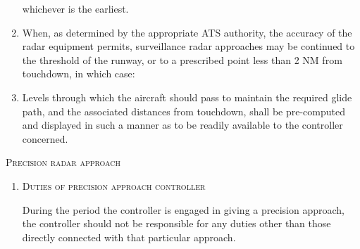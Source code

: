 \begin{enumeratesc}
\begin{enumerate}
\begin{enumalph}

            \noindent whichever is the earliest.
        \end{enumalph}

        \item When, as determined by the appropriate ATS authority, the accuracy of the radar equipment permits, surveillance radar approaches may be continued to the threshold of the runway, or to a prescribed point less than 2 NM from touchdown, in which case:

        \item Levels through which the aircraft should pass to maintain the required glide path, and the associated distances from touchdown, shall be pre-computed and displayed in such a manner as to be readily available to the controller concerned.
    \end{enumerate}

    \item \textsc{Precision radar approach}
    \begin{enumerate}[labelindent=0pt,itemsep=0.2cm]
        \item \textsc{Duties of precision approach controller}
        \par\noindent During the period the controller is engaged in giving a precision approach, the controller should not be responsible for any duties other than those directly connected with that particular approach.


\end{enumerate}
\end{enumeratesc}
